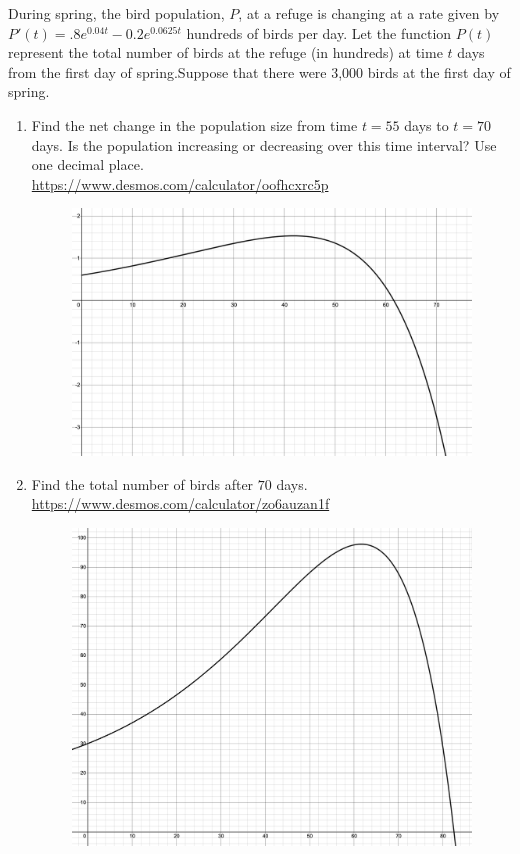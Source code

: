 \newpage

\begin{example}
During spring, the bird population, $P$, at a refuge is changing at a rate given by $P'(t)=.8e^{0.04t}-0.2e^{0.0625t}$ hundreds of birds per day.  Let the function $P(t)$ represent the total number of birds at the refuge (in hundreds) at time $t$ days from the first day of spring.Suppose that there were 3,000 birds at the first day of spring.  \\
\renewcommand{\labelenumi}{\textbf{(\alph{enumi})}}
\begin{enumerate}[leftmargin=*]
\item Find the net change in the population size from time $t=55$ days to $t=70$ days.  Is the population increasing or decreasing over this time interval?  Use one decimal place. \\
\url{https://www.desmos.com/calculator/oofhcxrc5p}
\begin{figure}[h!]
        \flushleft
        \includegraphics[scale=0.20]{images/netChange/birdPopulation1.png}
    \end{figure}
\item Find the total number of birds after $70$ days.\\
\url{https://www.desmos.com/calculator/zo6auzan1f}
\begin{figure}[h!]
        \flushleft
        \includegraphics[scale=0.15]{images/netChange/birdPopulation2.png}

\end{figure}
\end{enumerate}
\end{example}
